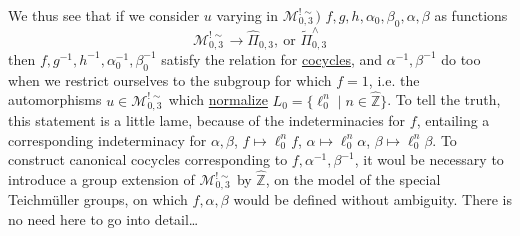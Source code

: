 We thus see that if we consider  $u$ varying in $\mathcal M_{0,3}^{!\sim})$ $f,g,h,\alpha_0,\beta_0,\alpha,\beta$ as functions
\[
\mathcal M_{0,3}^{!\sim}\longrightarrow\widehat{\Pi}_{0,3},\ \text{or }\widetilde{\Pi}_{0,3}^{\wedge}
\]
then $f,g^{-1},h^{-1},\alpha_0^{-1},\beta_0^{-1}$ satisfy the relation for \uline{cocycles}, and $\alpha^{-1},\beta^{-1}$ do too when we restrict ourselves to the subgroup for which $f=1$, i.e. the automorphisms $u\in\mathcal M_{0,3}^{!\sim}$ which \uline{normalize}  $L_0=\{\ell_0^n\mid n\in\widehat{\mathbb Z}\}$. To tell the truth, this statement  is a little lame, because of the indeterminacies for $f$, entailing a corresponding indeterminacy for $\alpha,\beta$, $f\mapsto\ell_0^n f$, $\alpha\mapsto\ell_0^n\alpha$, $\beta\mapsto\ell_0^n\beta$. To construct canonical cocycles corresponding to $f,\alpha^{-1},\beta^{-1}$, it woul be necessary to introduce a group extension of $\mathcal M_{0,3}^{!\sim}$ by $\widehat{\mathbb Z}$, on the model of the special Teichmüller groups, on which $f,\alpha,\beta$ would be defined without ambiguity. There is no need here to go into detail\ldots
